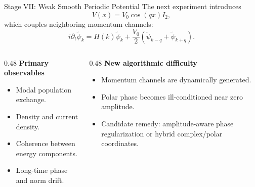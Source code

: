 \documentclass[aspectratio=169,10pt]{beamer}
\begin{document}
\begin{frame}{Stage VII: Weak Smooth Periodic Potential}
The next experiment introduces
\begin{equation*}
V(x)=V_0\cos(qx)I_2,
\end{equation*}
which couples neighboring momentum channels:
\begin{equation*}
i\partial_t\widetilde\psi_k=
H(k)\widetilde\psi_k+\frac{V_0}{2}
\left(\widetilde\psi_{k-q}+\widetilde\psi_{k+q}\right).
\end{equation*}

\begin{columns}[T,onlytextwidth]
\begin{column}{0.48\textwidth}
\textbf{Primary observables}
\begin{itemize}
  \item Modal population exchange.
  \item Density and current density.
  \item Coherence between energy components.
  \item Long-time phase and norm drift.
\end{itemize}
\end{column}
\begin{column}{0.48\textwidth}
\textbf{New algorithmic difficulty}
\begin{itemize}
  \item Momentum channels are dynamically generated.
  \item Polar phase becomes ill-conditioned near zero amplitude.
  \item Candidate remedy: amplitude-aware phase regularization or hybrid
  complex/polar coordinates.
\end{itemize}
\end{column}
\end{columns}
\end{frame}
\end{document}

